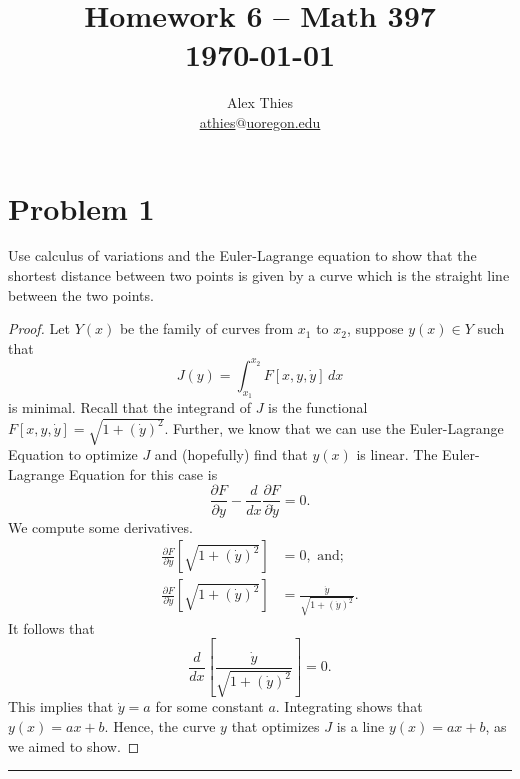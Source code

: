 \documentclass[letterpaper, 12pt]{amsart}
\theoremstyle{definition}  							%
\begin{document}
	\title{Homework 6  -- Math 397 \\ \today}
	\author{Alex Thies \\ \href{mailto:athies@uoregon.edu}{\lowercase{athies$@$uoregon.edu}}}

	\maketitle

	\section*{Problem 1}
	Use calculus of variations and the Euler-Lagrange equation to show that the shortest distance between two points is given by a curve which is the straight line between the two points.

	\begin{proof}
	Let $Y(x)$ be the family of curves from $x_{1}$ to $x_{2}$, suppose $y(x) \in Y$ such that $$J(y) = \int_{x_{1}}^{x_{2}} F[x,y,\dot{y}] \, dx$$ is minimal.
	Recall that the integrand of $J$ is the functional $F[x,y,\dot{y}] = \sqrt{1 + (\dot{y})^2}$.
	Further, we know that we can use the Euler-Lagrange Equation to optimize $J$ and (hopefully) find that $y(x)$ is linear.
	The Euler-Lagrange Equation for this case is $$\frac{\partial F}{\partial y} - \frac{d}{dx} \frac{\partial F}{\partial \dot{y}} = 0.$$
	We compute some derivatives.
		\begin{align*}
			\frac{\partial F}{\partial y}\left[ \sqrt{1 + (\dot{y})^2} \right] &= 0, \text{ and;} \\
			\frac{\partial F}{\partial \dot{y}} \left[ \sqrt{1 + (\dot{y})^2} \right] &= \frac{\dot{y}}{\sqrt{1 + (\dot{y})^2}}.
		\end{align*}
	It follows that $$\frac{d}{dx}\left[ \frac{\dot{y}}{\sqrt{1 + (\dot{y})^2}} \right] = 0.$$
	This implies that $\dot{y} = a$ for some constant $a$.
	Integrating shows that $y(x) = ax + b$.
	Hence, the curve $y$ that optimizes $J$ is a line $y(x) = ax + b$, as we aimed to show.
	\end{proof}
	\vspace*{2mm}
	\hrule
	\vspace*{2mm}
\end{document}
